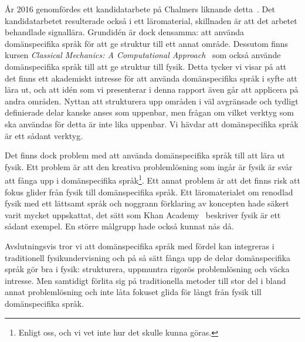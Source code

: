 År 2016 genomfördes ett kandidatarbete på Chalmers liknande
detta~\cite{kandidat2016}. Det kandidatarbetet resulterade också i ett
läromaterial, skillnaden är att det arbetet behandlade signallära. Grundidén är
dock densamma: att använda domänspecifika språk för att ge struktur till ett
annat område. Dessutom finns kursen \textit{Classical Mechanics: A Computational Approach}~\cite{hej} som också använde domänspecifika språk till att ge struktur till fysik. Detta tycker vi visar på att det finns ett
akademiskt intresse för att använda domänspecifika språk i syfte att lära ut,
och att idén som vi presenterar i denna rapport även går att applicera på
andra områden. Nyttan att strukturera upp områden i väl avgränsade och
tydligt definierade delar kanske anses som uppenbar, men frågan om vilket
verktyg som ska användas för detta är inte lika uppenbar. Vi hävdar att
domänspecifika språk är ett sådant verktyg.

Det finns dock problem med att använda domänspecifika språk till att lära ut fysik. Ett problem är att den kreativa problemlösning som ingår är fysik är svår att fånga upp i domänspecifika språk\footnote{Enligt oss, och vi vet inte hur det skulle kunna göras.}. Ett annat problem är att det finns risk att fokus glider från fysik till domänspecifika språk. Ett läromaterialet om renodlad fysik med ett lättsamt språk och noggrann förklaring av koncepten hade säkert varit mycket uppskattat, det sätt som Khan Academy~\cite{khan} beskriver fysik är ett sådant exempel. En större målgrupp hade också kunnat nås då.

Avslutningsvis tror vi att domänspecifika språk med fördel kan integreras i traditionell fysikundervisning och på så sätt fånga upp de delar domänspecifika språk gör bra i fysik: strukturera, uppmuntra rigorös problemlösning och väcka intresse. Men samtidigt förlita sig på traditionella metoder till stor del i bland annat problemlösning och inte låta fokuset glida för långt från fysik till domänspecifika språk.



